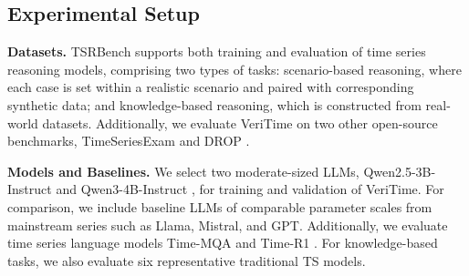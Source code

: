 \documentclass{article}
\theoremstyle{plain}
\theoremstyle{definition}
\theoremstyle{remark}
\begin{document}
\subsection{Experimental Setup}

\textbf{Datasets.} TSRBench supports both training and evaluation of time series reasoning models, comprising two types of tasks: scenario-based reasoning, where each case is set within a realistic scenario and paired with corresponding synthetic data; and knowledge-based reasoning, which is constructed from real-world datasets. Additionally, we evaluate VeriTime on two other open-source benchmarks, TimeSeriesExam \cite{cai2024timeseriesexam} and DROP \cite{naaclDROP}.

\textbf{Models and Baselines.} We select two moderate-sized LLMs, Qwen2.5-3B-Instruct and Qwen3-4B-Instruct \cite{yang2025qwen3}, for training and validation of VeriTime. For comparison, we include baseline LLMs of comparable parameter scales from mainstream series such as Llama, Mistral, and GPT. Additionally, we evaluate time series language models Time-MQA \cite{kong2025timeMQA} and Time-R1 \cite{luo2025timeR1}. For knowledge-based tasks, we also evaluate six representative traditional TS models.
\end{document}
